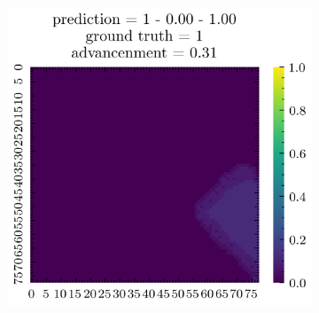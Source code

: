 \documentclass[../document.tex]{subfiles}
\begin{document}
\begin{figure}
\begin{subfigure}[b]{0.19\textwidth}
    \end{subfigure}  
    \begin{subfigure}[b]{0.19\textwidth}
        \includegraphics[width=\linewidth]{../img/5/quarry/best/patch-2d-4.png}
    \end{subfigure}  
\end{figure}
\end{document}
